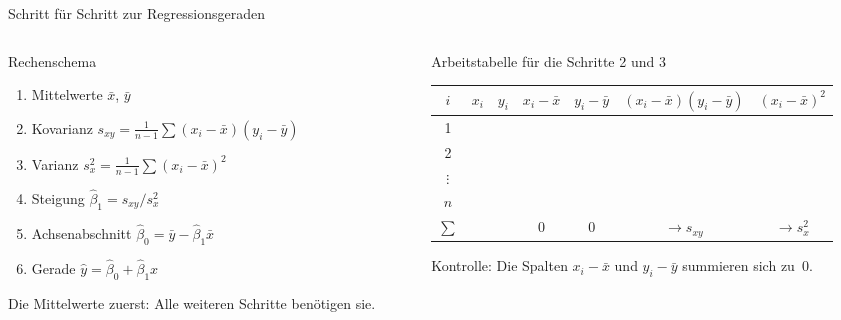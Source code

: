 \documentclass[aspectratio=169,11pt]{beamer}
\begin{document}
\begin{frame}{Schritt für Schritt zur Regressionsgeraden}
  \begin{columns}[T]
    \begin{column}{0.4\textwidth}
      \begin{block}{Rechenschema}
        \small
        \begin{enumerate}
          \setlength{\itemsep}{1pt}
          \item Mittelwerte $\bar{x}$, $\bar{y}$
          \item Kovarianz $s_{xy} = \frac{1}{n-1}\sum (x_i-\bar{x})(y_i-\bar{y})$
          \item Varianz $s_x^{2} = \frac{1}{n-1}\sum (x_i-\bar{x})^{2}$
          \item Steigung $\hat{\beta}_1 = s_{xy} / s_x^{2}$
          \item Achsenabschnitt $\hat{\beta}_0 = \bar{y} - \hat{\beta}_1 \bar{x}$
          \item Gerade $\hat{y} = \hat{\beta}_0 + \hat{\beta}_1 x$
        \end{enumerate}
      \end{block}
      \footnotesize Die Mittelwerte zuerst: Alle weiteren Schritte benötigen sie.
    \end{column}
    \begin{column}{0.58\textwidth}
      \begin{block}{Arbeitstabelle für die Schritte 2 und 3}
        \begin{center}
          \scriptsize
          \renewcommand{\arraystretch}{1.2}
          \setlength{\tabcolsep}{3pt}
          \begin{tabular}{c|cc|cc|cc}
            \toprule
            $i$ & $x_i$ & $y_i$ & $x_i-\bar{x}$ & $y_i-\bar{y}$ & $(x_i-\bar{x})(y_i-\bar{y})$ & $(x_i-\bar{x})^{2}$ \\
            \midrule
            1 & & & & & & \\
            2 & & & & & & \\
            $\vdots$ & & & & & & \\
            $n$ & & & & & & \\
            \midrule
            $\sum$ & & & $0$ & $0$ & $\to s_{xy}$ & $\to s_x^{2}$ \\
            \bottomrule
          \end{tabular}
        \end{center}
        \small Kontrolle: Die Spalten $x_i-\bar{x}$ und $y_i-\bar{y}$ summieren
        sich zu~$0$.
      \end{block}
    \end{column}
  \end{columns}
\end{frame}
\end{document}
